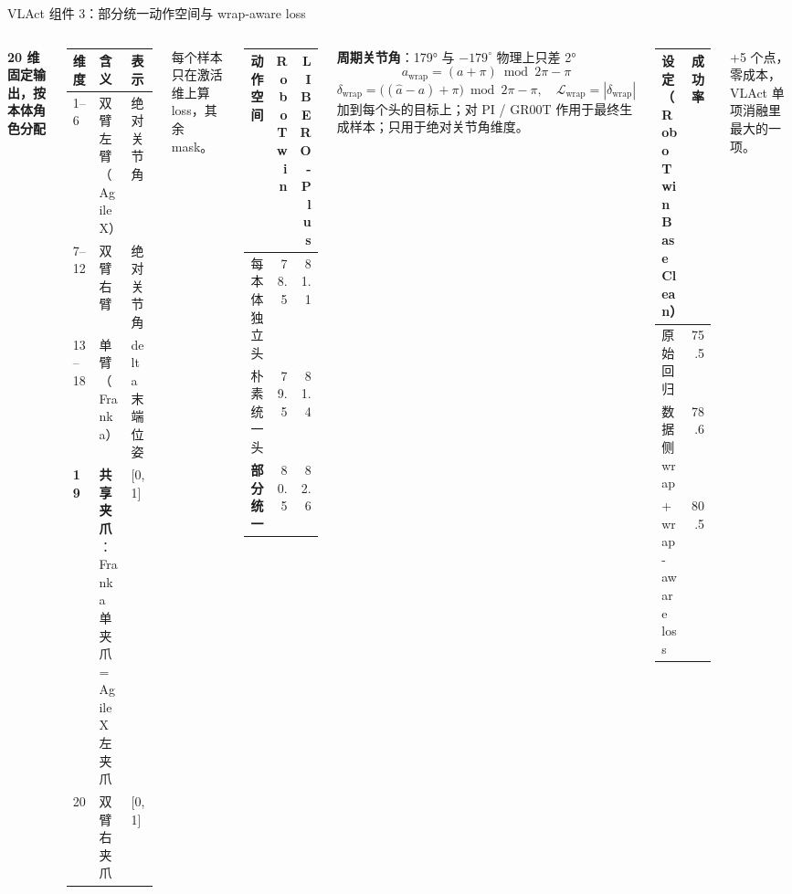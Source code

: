 \documentclass[aspectratio=169,10pt]{beamer}
\newcommand{\pos}[1]{\textcolor{positive}{#1}}
\newcommand{\HL}[1]{\textcolor{emphasis}{#1}}
\begin{document}
\begin{frame}{VLAct 组件 3：部分统一动作空间与 wrap-aware loss}
  \begin{columns}[T]
    \textbf{20 维固定输出，按本体角色分配}
    \begin{center}\footnotesize
    \begin{tabular}{p{0.9cm}p{3.7cm}p{1.9cm}}
      \toprule
      维度 & 含义 & 表示 \\
      \midrule
      1–6 & 双臂左臂（AgileX） & 绝对关节角 \\
      7–12 & 双臂右臂 & 绝对关节角 \\
      13–18 & 单臂（Franka） & delta 末端位姿 \\
      \textbf{19} & \textbf{共享夹爪}：Franka 单夹爪 = AgileX 左夹爪 & [0,1] \\
      20 & 双臂右夹爪 & [0,1] \\
      \bottomrule
    \end{tabular}
    \end{center}
    每个样本只在激活维上算 loss，其余 mask。
    \vspace{4pt}
    \begin{center}\footnotesize
    \begin{tabular}{lrr}
      \toprule
      动作空间 & RoboTwin & LIBERO-Plus \\
      \midrule
      每本体独立头 & 78.5 & 81.1 \\
      朴素统一头 & 79.5 & 81.4 \\
      \textbf{部分统一} & \HL{80.5} & \HL{82.6} \\
      \bottomrule
    \end{tabular}
    \end{center}
    \textbf{周期关节角}：179° 与 $-179^\circ$ 物理上只差 2°
    \[
      a_{\text{wrap}} = (a+\pi) \bmod 2\pi - \pi
    \]
    \[
      \delta_{\text{wrap}} = \big((\hat a - a)+\pi\big) \bmod 2\pi - \pi,\quad
      \mathcal{L}_{\text{wrap}} = |\delta_{\text{wrap}}|
    \]
    加到每个头的目标上；对 PI / GR00T 作用于最终生成样本；只用于绝对关节角维度。
    \vspace{4pt}
    \begin{center}\footnotesize
    \begin{tabular}{lr}
      \toprule
      设定（RoboTwin Base Clean） & 成功率 \\
      \midrule
      原始回归 & 75.5 \\
      数据侧 wrap & 78.6 \\
      + wrap-aware loss & \HL{80.5} \\
      \bottomrule
    \end{tabular}
    \end{center}
    \pos{+5 个点，零成本}，VLAct 单项消融里最大的一项。
  \end{columns}
\end{frame}
\end{document}
